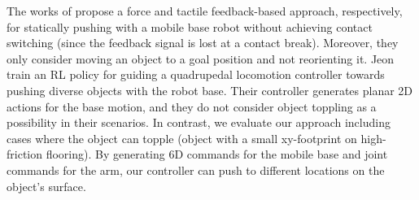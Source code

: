 The works of \cite{force_push_heins, ozdamar2024pushing} propose a force and tactile feedback-based approach, respectively, for statically pushing with a mobile base robot without achieving contact switching (since the feedback signal is lost at a contact break). Moreover, they only consider moving an object to a goal position and not reorienting it. Jeon~\etal\cite{quadruped_pushing} train an RL policy for guiding a quadrupedal locomotion controller towards pushing diverse objects with the robot base. Their controller generates planar 2D actions for the base motion, and they do not consider object toppling as a possibility in their scenarios. In contrast, we evaluate our approach including cases where the object can topple (\ie object with a small xy-footprint on high-friction flooring). By generating 6D commands for the mobile base and joint commands for the arm, our controller can push to different locations on the object's surface.
